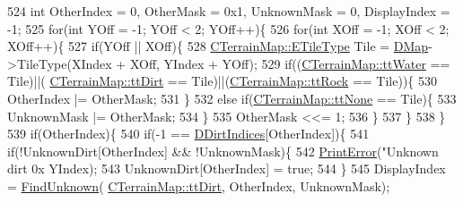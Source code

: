 \begin{DoxyCode}
{{{{524                     \textcolor{keywordtype}{int} OtherIndex = 0, OtherMask = 0x1, UnknownMask = 0, DisplayIndex = -1;
525                     \textcolor{keywordflow}{for}(\textcolor{keywordtype}{int} YOff = -1; YOff < 2; YOff++)\{
526                         \textcolor{keywordflow}{for}(\textcolor{keywordtype}{int} XOff = -1; XOff < 2; XOff++)\{
527                             \textcolor{keywordflow}{if}(YOff || XOff)\{
528                                 \hyperlink{classCTerrainMap_aff2ab991e237269941416dd79d8871d4}{CTerrainMap::ETileType} Tile = 
      \hyperlink{classCMapRenderer_ab9a199c61aa1c87a3248af3085d8ba52}{DMap}->TileType(XIndex + XOff, YIndex + YOff);
529                                 \textcolor{keywordflow}{if}((\hyperlink{classCTerrainMap_aff2ab991e237269941416dd79d8871d4ab7c7a2abbef411fd768a4f209e307de5}{CTerrainMap::ttWater} == Tile)||(
      \hyperlink{classCTerrainMap_aff2ab991e237269941416dd79d8871d4a49fb754039632e7127fca005dd95bab8}{CTerrainMap::ttDirt} == Tile)||(\hyperlink{classCTerrainMap_aff2ab991e237269941416dd79d8871d4a215740f194a2d72a21d47c848fbfecad}{CTerrainMap::ttRock} == Tile))\{
530                                     OtherIndex |= OtherMask;   
531                                 \}
532                                 \textcolor{keywordflow}{else} \textcolor{keywordflow}{if}(\hyperlink{classCTerrainMap_aff2ab991e237269941416dd79d8871d4a481e779132fb16414d17870bd6229eb5}{CTerrainMap::ttNone} == Tile)\{
533                                     UnknownMask |= OtherMask;
534                                 \}
535                                 OtherMask <<= 1;
536                             \}
537                         \}
538                     \}
539                     \textcolor{keywordflow}{if}(OtherIndex)\{
540                         \textcolor{keywordflow}{if}(-1 == \hyperlink{classCMapRenderer_a5916c26aa5bedf8367a8f3f7efb457bf}{DDirtIndices}[OtherIndex])\{
541                             \textcolor{keywordflow}{if}(!UnknownDirt[OtherIndex] && !UnknownMask)\{
542                                 \hyperlink{Debug_8h_a2ed825eefefe35baf59a93a8c641323d}{PrintError}(\textcolor{stringliteral}{"Unknown dirt 0x%
       YIndex);   
543                                 UnknownDirt[OtherIndex] = \textcolor{keyword}{true};
544                             \}
545                             DisplayIndex = \hyperlink{classCMapRenderer_aec3c1d3294ac3af8ebb717ed5be88870}{FindUnknown}(
      \hyperlink{classCTerrainMap_aff2ab991e237269941416dd79d8871d4a49fb754039632e7127fca005dd95bab8}{CTerrainMap::ttDirt}, OtherIndex, UnknownMask);
}}}}}
\end{DoxyCode}
